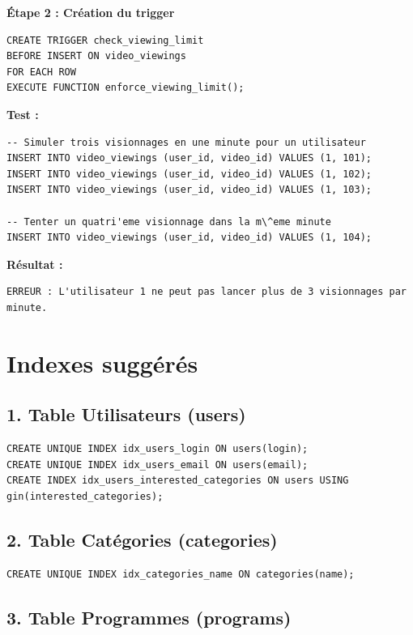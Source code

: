 \documentclass[a4paper, 12pt]{article}
\begin{document}
\textbf{Étape 2 : Création du trigger}

\begin{lstlisting}
CREATE TRIGGER check_viewing_limit
BEFORE INSERT ON video_viewings
FOR EACH ROW
EXECUTE FUNCTION enforce_viewing_limit();
\end{lstlisting}

\textbf{Test :}

\begin{lstlisting}
-- Simuler trois visionnages en une minute pour un utilisateur
INSERT INTO video_viewings (user_id, video_id) VALUES (1, 101);
INSERT INTO video_viewings (user_id, video_id) VALUES (1, 102);
INSERT INTO video_viewings (user_id, video_id) VALUES (1, 103);

-- Tenter un quatri'eme visionnage dans la m\^eme minute
INSERT INTO video_viewings (user_id, video_id) VALUES (1, 104);
\end{lstlisting}

\textbf{Résultat :}

\begin{verbatim}
ERREUR : L'utilisateur 1 ne peut pas lancer plus de 3 visionnages par minute.
\end{verbatim}

\section*{Indexes suggérés}

\subsection*{1. Table Utilisateurs (users)}

\begin{lstlisting}
CREATE UNIQUE INDEX idx_users_login ON users(login);
CREATE UNIQUE INDEX idx_users_email ON users(email);
CREATE INDEX idx_users_interested_categories ON users USING gin(interested_categories);
\end{lstlisting}

\subsection*{2. Table Catégories (categories)}

\begin{lstlisting}
CREATE UNIQUE INDEX idx_categories_name ON categories(name);
\end{lstlisting}

\subsection*{3. Table Programmes (programs)}
\end{document}
